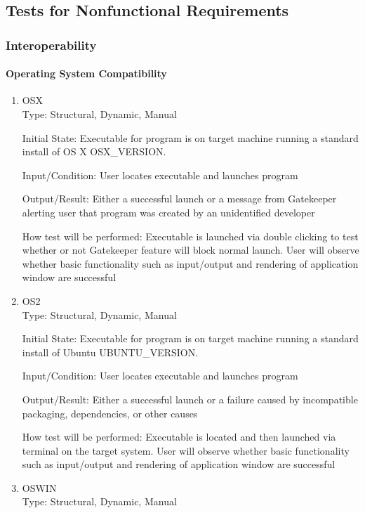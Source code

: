 \documentclass[12pt, titlepage]{article}
\begin{document}
	\subsection{Tests for Nonfunctional Requirements}
	\subsubsection{Interoperability}
	
	\paragraph{Operating System Compatibility}
	\begin{enumerate}
		\item{OSX\\}
		Type: Structural, Dynamic, Manual
		
		Initial State: Executable for program is on target machine running a
		standard install of OS X OSX\_VERSION.
		
		Input/Condition: User locates executable and launches program
		
		Output/Result: Either a successful launch or a message from Gatekeeper
		alerting user that program was created by an unidentified developer
		
		How test will be performed: Executable is launched via double clicking to
		test whether or not Gatekeeper feature will block normal launch. User will
		observe whether basic functionality such as input/output and rendering of
		application window are successful
		
		\item{OS2\\}
		Type: Structural, Dynamic, Manual
		
		Initial State: Executable for program is on target machine running a
		standard install of Ubuntu UBUNTU\_VERSION.
		
		Input/Condition: User locates executable and launches program
		
		Output/Result: Either a successful launch or a failure caused by incompatible
		packaging, dependencies, or other causes
		
		How test will be performed: Executable is located and then launched via
		terminal on the target system. User will observe whether basic
		functionality such as input/output and rendering of application window are
		successful

		\item{OSWIN\\}
		Type: Structural, Dynamic, Manual
		

\end{enumerate}
\end{document}
